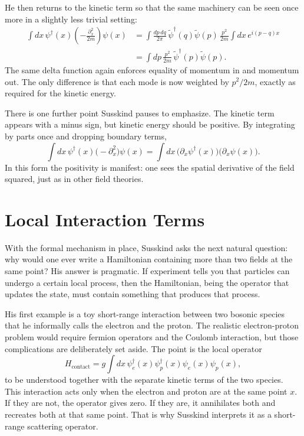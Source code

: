 He then returns to the kinetic term so that the same machinery can be seen once more in a slightly less trivial setting:
\begin{align}
\int dx\,\psi^\dagger(x)\left(-\frac{\partial_x^2}{2m}\right)\psi(x)
&=
\int \frac{dp\,dq}{2\pi}\,
\tilde\psi^\dagger(q)\tilde\psi(p)\,
\frac{p^2}{2m}
\int dx\,e^{i(p-q)x}
\\
&=
\int dp\,\frac{p^2}{2m}\,\tilde\psi^\dagger(p)\tilde\psi(p).
\end{align}
The same delta function again enforces equality of momentum in and momentum out. The only difference is that each mode is now weighted by \(p^2/2m\), exactly as required for the kinetic energy.

There is one further point Susskind pauses to emphasize. The kinetic term appears with a minus sign, but kinetic energy should be positive. By integrating by parts once and dropping boundary terms,
\begin{equation}
\int dx\,\psi^\dagger(x)\bigl(-\partial_x^2\bigr)\psi(x)
=
\int dx\,\bigl(\partial_x\psi^\dagger(x)\bigr)\bigl(\partial_x\psi(x)\bigr).
\end{equation}
In this form the positivity is manifest: one sees the spatial derivative of the field squared, just as in other field theories.

\section{Local Interaction Terms}

With the formal mechanism in place, Susskind asks the next natural question: why would one ever write a Hamiltonian containing more than two fields at the same point? His answer is pragmatic. If experiment tells you that particles can undergo a certain local process, then the Hamiltonian, being the operator that updates the state, must contain something that produces that process.

His first example is a toy short-range interaction between two bosonic species that he informally calls the electron and the proton. The realistic electron-proton problem would require fermion operators and the Coulomb interaction, but those complications are deliberately set aside. The point is the local operator
\begin{equation}
H_{\mathrm{contact}}=
g\int dx\,\psi_e^\dagger(x)\psi_p^\dagger(x)\psi_e(x)\psi_p(x),
\end{equation}
to be understood together with the separate kinetic terms of the two species. This interaction acts only when the electron and proton are at the same point \(x\). If they are not, the operator gives zero. If they are, it annihilates both and recreates both at that same point. That is why Susskind interprets it as a short-range scattering operator.

